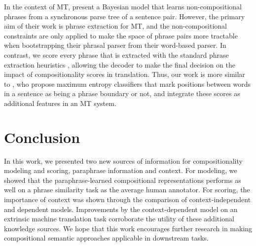 \documentclass[11pt,letterpaper]{article}
\begin{document}
In the context of MT,  present a Bayesian model that learns non-compositional phrases from a synchronous parse tree of a sentence pair.
However, the primary aim of their work is phrase extraction for MT, and the non-compositional constraints are only applied to make the space of phrase pairs more tractable when bootstrapping their phrasal parser from their word-based parser. 
In contrast, we score every phrase that is extracted with the standard phrase extraction heuristics \cite{Chiang2007}, allowing the decoder to make the final decision on the impact of compositionality scores in translation. 
Thus, our work is more similar to , who propose maximum entropy classifiers that mark positions between words in a sentence as being a phrase boundary or not, and integrate these scores as additional features in an MT system.  

\section{Conclusion}

In this work, we presented two new sources of information for compositionality modeling and scoring, paraphrase information and context. 
For modeling, we showed that the paraphrase-learned compositional representations performs as well on a phrase similarity task as the average human annotator.
For scoring, the importance of context was shown through the comparison of context-independent and dependent models. 
Improvements by the context-dependent model on an extrinsic machine translation task corroborate the utility of these additional knowledge sources. 
We hope that this work encourages further research in making compositional semantic approaches applicable in downstream tasks. 



\end{document}
